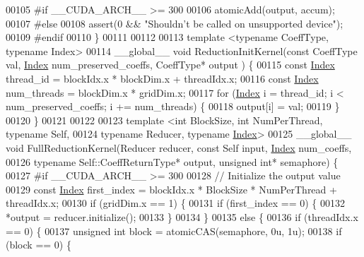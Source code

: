 \begin{DoxyCode}
00105 \textcolor{preprocessor}{#if \_\_CUDA\_ARCH\_\_ >= 300}
00106   atomicAdd(output, accum);
00107 \textcolor{preprocessor}{#else}
00108   assert(0 && \textcolor{stringliteral}{"Shouldn't be called on unsupported device"});
00109 \textcolor{preprocessor}{#endif}
00110 \}
00111 
00112 
00113 \textcolor{keyword}{template} <\textcolor{keyword}{typename} CoeffType, \textcolor{keyword}{typename} Index>
00114 \_\_global\_\_ \textcolor{keywordtype}{void} ReductionInitKernel(\textcolor{keyword}{const} CoeffType val, \hyperlink{namespace_eigen_a62e77e0933482dafde8fe197d9a2cfde}{Index} num\_preserved\_coeffs, CoeffType* output
      ) \{
00115   \textcolor{keyword}{const} \hyperlink{namespace_eigen_a62e77e0933482dafde8fe197d9a2cfde}{Index} thread\_id = blockIdx.x * blockDim.x + threadIdx.x;
00116   \textcolor{keyword}{const} \hyperlink{namespace_eigen_a62e77e0933482dafde8fe197d9a2cfde}{Index} num\_threads = blockDim.x * gridDim.x;
00117   \textcolor{keywordflow}{for} (\hyperlink{namespace_eigen_a62e77e0933482dafde8fe197d9a2cfde}{Index} i = thread\_id; i < num\_preserved\_coeffs; i += num\_threads) \{
00118     output[i] = val;
00119   \}
00120 \}
00121 
00122 
00123 \textcolor{keyword}{template} <\textcolor{keywordtype}{int} BlockSize, \textcolor{keywordtype}{int} NumPerThread, \textcolor{keyword}{typename} Self,
00124           \textcolor{keyword}{typename} Reducer, \textcolor{keyword}{typename} \hyperlink{namespace_eigen_a62e77e0933482dafde8fe197d9a2cfde}{Index}>
00125 \_\_global\_\_ \textcolor{keywordtype}{void} FullReductionKernel(Reducer reducer, \textcolor{keyword}{const} Self input, \hyperlink{namespace_eigen_a62e77e0933482dafde8fe197d9a2cfde}{Index} num\_coeffs,
00126                                     \textcolor{keyword}{typename} Self::CoeffReturnType* output, \textcolor{keywordtype}{unsigned} \textcolor{keywordtype}{int}* semaphore) \{
00127 \textcolor{preprocessor}{#if \_\_CUDA\_ARCH\_\_ >= 300}
00128   \textcolor{comment}{// Initialize the output value}
00129   \textcolor{keyword}{const} \hyperlink{namespace_eigen_a62e77e0933482dafde8fe197d9a2cfde}{Index} first\_index = blockIdx.x * BlockSize * NumPerThread + threadIdx.x;
00130   \textcolor{keywordflow}{if} (gridDim.x == 1) \{
00131     \textcolor{keywordflow}{if} (first\_index == 0) \{
00132       *output = reducer.initialize();
00133     \}
00134   \}
00135   \textcolor{keywordflow}{else} \{
00136     \textcolor{keywordflow}{if} (threadIdx.x == 0) \{
00137       \textcolor{keywordtype}{unsigned} \textcolor{keywordtype}{int} block = atomicCAS(semaphore, 0u, 1u);
00138       \textcolor{keywordflow}{if} (block == 0) \{

\end{DoxyCode}
